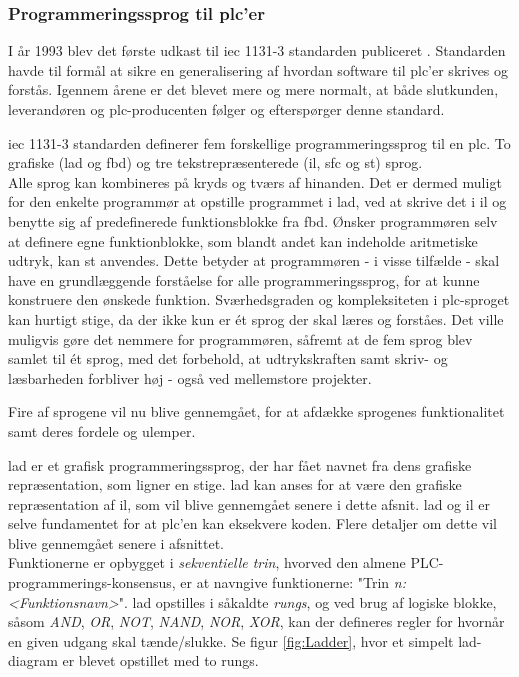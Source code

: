 \subsubsection{Programmeringssprog til \gls{plc}'er}
\noindent I år 1993 blev det første udkast til \gls{iec} 1131-3 standarden publiceret \cite{iecStandard}. Standarden havde til formål at sikre en generalisering af hvordan software til \gls{plc}'er skrives og forstås. Igennem årene er det blevet mere og mere normalt, at både slutkunden, leverandøren og \gls{plc}-producenten følger og efterspørger denne standard. 

\noindent \gls{iec} 1131-3 standarden definerer fem forskellige programmeringssprog til en \gls{plc}. 
To grafiske (\gls{lad} og \gls{fbd}) og tre tekstrepræsenterede (\gls{il}, \gls{sfc} og \gls{st}) sprog. \\
\noindent Alle sprog kan kombineres på kryds og tværs af hinanden. Det er dermed muligt for den enkelte programmør at opstille programmet i \gls{lad}, ved at skrive det i \gls{il} og benytte sig af predefinerede funktionsblokke fra \gls{fbd}. Ønsker programmøren selv at definere egne funktionblokke, som blandt andet kan indeholde aritmetiske udtryk, kan \gls{st} anvendes. Dette betyder at programmøren - i visse tilfælde - skal have en grundlæggende forståelse for alle programmeringssprog, for at kunne konstruere den ønskede funktion. Sværhedsgraden og kompleksiteten i \gls{plc}-sproget kan hurtigt stige, da der ikke kun er ét sprog der skal læres og forståes. Det ville muligvis gøre det nemmere for programmøren, såfremt at de fem sprog blev samlet til ét sprog, med det forbehold, at udtrykskraften samt skriv- og læsbarheden forbliver høj - også ved mellemstore projekter. 

\noindent Fire af sprogene vil nu blive gennemgået, for at afdække sprogenes funktionalitet samt deres fordele og ulemper. 

\label{subsec:lad}
\gls{lad} er et grafisk programmeringssprog, der har fået navnet fra dens grafiske repræsentation, som ligner en stige. \gls{lad} kan anses for at være den grafiske repræsentation af \gls{il}, som vil blive gennemgået senere i dette afsnit. \gls{lad} og \gls{il} er selve fundamentet for at \gls{plc}'en kan eksekvere koden. Flere detaljer om dette vil blive gennemgået senere i afsnittet.\\

\noindent Funktionerne er opbygget i \textit{sekventielle trin}, hvorved den almene PLC-programmerings-konsensus, er at navngive funktionerne: "Trin \textit{n: <Funktionsnavn>}".  
\gls{lad} opstilles i såkaldte \textit{rungs}, og ved brug af logiske blokke, såsom \textit{AND}, \textit{OR}, \textit{NOT}, \textit{NAND}, \textit{NOR}, \textit{XOR}, kan der defineres regler for hvornår en given udgang skal tænde/slukke. Se figur \ref{fig:Ladder}, hvor et simpelt \gls{lad}-diagram er blevet opstillet med to rungs.\\


